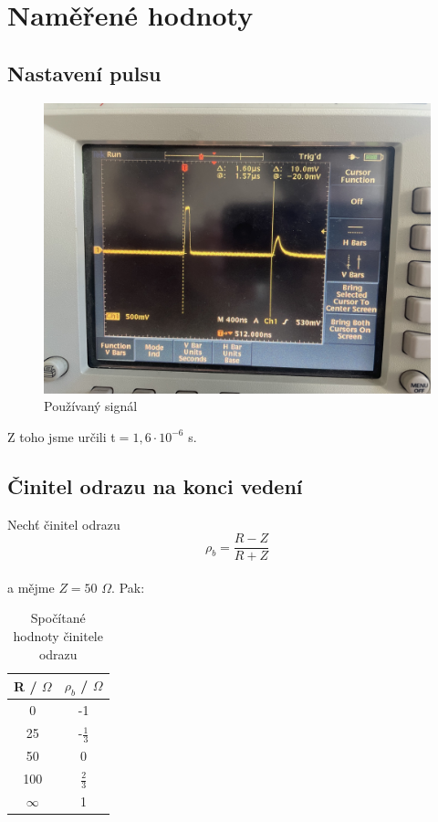 
\section{Naměřené hodnoty}
\subsection{Nastavení pulsu}
\begin{figure}[h]
\centering
\includegraphics[width=14cm]{images/obr_1.jpg}
\caption{Používaný signál}
\label{fig:5}
\end{figure}

Z toho jsme určili t$=1,6 \cdot 10^{-6}$ s.
\newpage
\subsection{Činitel odrazu na konci vedení}
Nechť činitel odrazu \[\rho_b = \frac{R - Z}{R + Z}\] \\ a mějme $Z=50$ $\Omega$. Pak:

\begin{table}
    \centering
    \caption{Spočítané hodnoty činitele odrazu}
    \begin{tabular}{|c|c|}
       \hline
       R / $\Omega$ & $\rho_b$ / $\Omega$\\
       \hline
       0  & -1\\
       \hline
       25  & -$\frac{1}{3}$\\
       \hline
       50  & 0\\
       \hline
       100  & $\frac{2}{3}$\\
       \hline
       $\infty$ & 1\\
       \hline
    \end{tabular}
    \label{tab:1}
\end{table}
